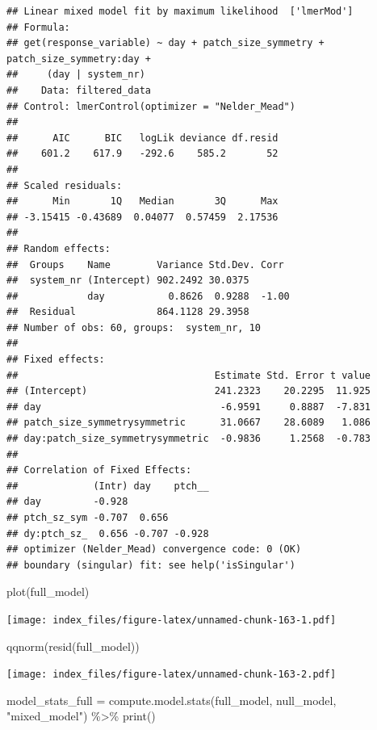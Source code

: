 \documentclass[
]{article}
\newenvironment{Shaded}{\begin{snugshade}}{\end{snugshade}}
\newcommand{\FunctionTok}[1]{\textcolor[rgb]{0.00,0.00,0.00}{#1}}
\newcommand{\NormalTok}[1]{#1}
\newcommand{\OtherTok}[1]{\textcolor[rgb]{0.56,0.35,0.01}{#1}}
\newcommand{\SpecialCharTok}[1]{\textcolor[rgb]{0.00,0.00,0.00}{#1}}
\newcommand{\StringTok}[1]{\textcolor[rgb]{0.31,0.60,0.02}{#1}}
\begin{document}
\begin{verbatim}
## Linear mixed model fit by maximum likelihood  ['lmerMod']
## Formula: 
## get(response_variable) ~ day + patch_size_symmetry + patch_size_symmetry:day +  
##     (day | system_nr)
##    Data: filtered_data
## Control: lmerControl(optimizer = "Nelder_Mead")
## 
##      AIC      BIC   logLik deviance df.resid 
##    601.2    617.9   -292.6    585.2       52 
## 
## Scaled residuals: 
##      Min       1Q   Median       3Q      Max 
## -3.15415 -0.43689  0.04077  0.57459  2.17536 
## 
## Random effects:
##  Groups    Name        Variance Std.Dev. Corr 
##  system_nr (Intercept) 902.2492 30.0375       
##            day           0.8626  0.9288  -1.00
##  Residual              864.1128 29.3958       
## Number of obs: 60, groups:  system_nr, 10
## 
## Fixed effects:
##                                  Estimate Std. Error t value
## (Intercept)                      241.2323    20.2295  11.925
## day                               -6.9591     0.8887  -7.831
## patch_size_symmetrysymmetric      31.0667    28.6089   1.086
## day:patch_size_symmetrysymmetric  -0.9836     1.2568  -0.783
## 
## Correlation of Fixed Effects:
##             (Intr) day    ptch__
## day         -0.928              
## ptch_sz_sym -0.707  0.656       
## dy:ptch_sz_  0.656 -0.707 -0.928
## optimizer (Nelder_Mead) convergence code: 0 (OK)
## boundary (singular) fit: see help('isSingular')
\end{verbatim}

\begin{Shaded}
\begin{Highlighting}[]
\FunctionTok{plot}\NormalTok{(full\_model)}
\end{Highlighting}
\end{Shaded}

\texttt{[image: index\_files/figure-latex/unnamed-chunk-163-1.pdf]}

\begin{Shaded}
\begin{Highlighting}[]
\FunctionTok{qqnorm}\NormalTok{(}\FunctionTok{resid}\NormalTok{(full\_model))}
\end{Highlighting}
\end{Shaded}

\texttt{[image: index\_files/figure-latex/unnamed-chunk-163-2.pdf]}

\begin{Shaded}
\begin{Highlighting}[]
\NormalTok{model\_stats\_full }\OtherTok{=} \FunctionTok{compute.model.stats}\NormalTok{(full\_model,}
\NormalTok{                                       null\_model,}
                                       \StringTok{"mixed\_model"}\NormalTok{) }\SpecialCharTok{\%\textgreater{}\%}
  \FunctionTok{print}\NormalTok{()}
\end{Highlighting}
\end{Shaded}
\end{document}

